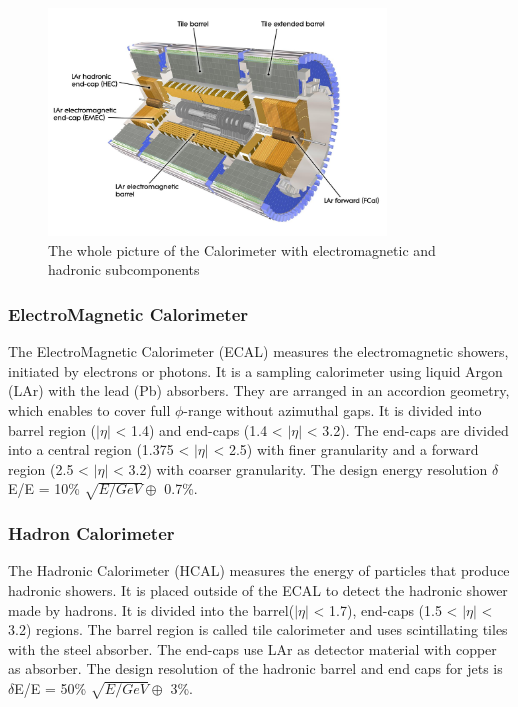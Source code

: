 \begin{figure}[tbp]
\begin{center}
 \includegraphics[width=0.8\textwidth,keepaspectratio]{figures/detector/Calo}
\caption{
The whole picture of the Calorimeter with electromagnetic and hadronic subcomponents
}
\label{fig:calo}
\end{center}
\end{figure}


\subsubsection{ElectroMagnetic Calorimeter}
The ElectroMagnetic Calorimeter (ECAL) measures the electromagnetic showers, initiated by electrons or photons. It is a sampling calorimeter using liquid Argon (LAr) with the lead (Pb) absorbers. They are arranged in an accordion geometry, which enables to cover full $\phi$-range without azimuthal gaps. It is divided into barrel region ($|\eta|$ < 1.4) and end-caps (1.4 < $|\eta|$ < 3.2). The end-caps are divided into a central region (1.375 < $|\eta|$ < 2.5) with finer granularity and a forward region (2.5 < $|\eta|$ < 3.2) with coarser granularity. The design energy resolution $\delta$E/E = 10\% $\sqrt{E/GeV} \oplus$ 0.7\%.

\subsubsection{Hadron Calorimeter}
The Hadronic Calorimeter (HCAL) measures the energy of particles that produce hadronic showers. It is placed outside of the ECAL to detect the hadronic shower made by hadrons.
It is divided into the barrel($|\eta|$ < 1.7), end-caps (1.5 < $|\eta|$ < 3.2) regions. The barrel region is called tile calorimeter and uses scintillating tiles with the steel absorber. The end-caps use LAr as detector material with copper as absorber. 
The design resolution of the hadronic barrel and end caps for jets is $\delta$E/E = 50\% $\sqrt{E/GeV} \oplus$ 3\%.


